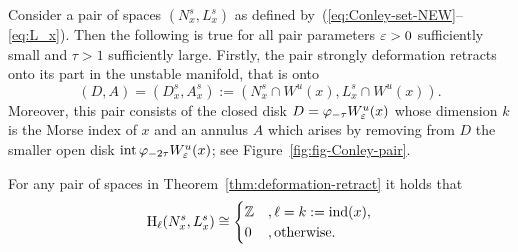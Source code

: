 \documentclass{article}
\begin{document}
\begin{theorem}\label{thm:deformation-retract}
Consider a pair of spaces $(N^s_x,L^s_x)$ as defined
by~(\ref{eq:Conley-set-NEW}--\ref{eq:L_x}).
Then the following is true for all pair parameters ${\varepsilon}>0$ sufficiently small
and $\tau>1$ sufficiently large. Firstly, the pair strongly
deformation retracts onto its part in the unstable manifold, that is onto
$$
     (D,A)=(D^s_x,A^s_x):=(N^s_x\cap W^u(x),L^s_x\cap W^u(x)) .
$$
Moreover, this pair consists of the closed disk $D=\varphi_{-\tau} W^u_{\varepsilon}(x)$
whose dimension $k$ is the Morse index of $x$ and an annulus $A$ which arises
by removing from $D$ the smaller open disk ${\rm int\, } \varphi_{-2\tau} W^u_{\varepsilon}(x)$;
see Figure~\ref{fig:fig-Conley-pair}.
\end{theorem}

\begin{corollary}\label{cor:conley-index-N-L}
For any pair of spaces in Theorem~\ref{thm:deformation-retract} it holds that
\begin{equation}\label{eq:N-L}
   \Ho_\ell(N^s_x,L^s_x)\cong
   \begin{cases}
       \Z&,\ell=k:=\IND(x),
       \\
       0&,\text{otherwise.}
   \end{cases}
\end{equation}
\end{corollary}
\end{document}
